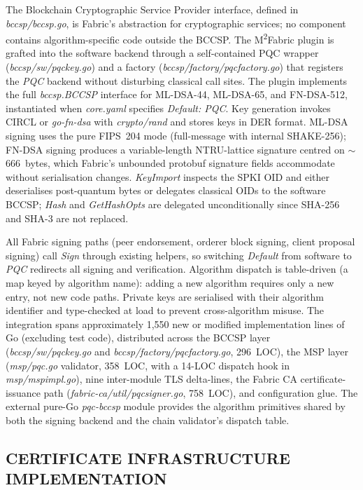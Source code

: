 \documentclass{ieeetj}
\newcommand{\mfabric}{M\textsuperscript{2}Fabric}
\begin{document}
The Blockchain Cryptographic Service Provider interface, defined in
\textit{bccsp/bccsp.go}, is Fabric's abstraction for cryptographic
services; no component contains algorithm-specific code outside the
BCCSP. The \mfabric{} plugin is grafted into the software backend
through a self-contained PQC wrapper (\textit{bccsp/sw/pqckey.go}) and a
factory (\textit{bccsp/factory/pqcfactory.go}) that registers the
\textit{PQC} backend without disturbing classical call sites. The plugin
implements the full \textit{bccsp.BCCSP} interface for ML-DSA-44,
ML-DSA-65, and FN-DSA-512, instantiated when \textit{core.yaml} specifies
\textit{Default: PQC}. Key generation invokes CIRCL or
\textit{go-fn-dsa} with \textit{crypto/rand} and stores keys in DER
format. ML-DSA signing uses the pure FIPS~204 mode (full-message with
internal SHAKE-256); FN-DSA signing produces a variable-length
NTRU-lattice signature centred on $\sim$666~bytes, which Fabric's
unbounded protobuf signature fields accommodate without serialisation
changes. \textit{KeyImport} inspects the SPKI OID and either
deserialises post-quantum bytes or delegates classical OIDs to the
software BCCSP; \textit{Hash} and \textit{GetHashOpts} are delegated
unconditionally since SHA-256 and SHA-3 are not replaced.

All Fabric signing paths (peer endorsement, orderer block signing, client
proposal signing) call \textit{Sign} through existing helpers, so
switching \textit{Default} from software to \textit{PQC} redirects all
signing and verification. Algorithm dispatch is table-driven (a map keyed
by algorithm name): adding a new algorithm requires only a new entry, not
new code paths. Private keys are serialised with their algorithm
identifier and type-checked at load to prevent cross-algorithm misuse.
The integration spans approximately 1{,}550 new or modified
implementation lines of Go (excluding test code),
distributed across the BCCSP layer (\textit{bccsp/sw/pqckey.go} and
\textit{bccsp/factory/pqcfactory.go}, 296~LOC), the MSP layer
(\textit{msp/pqc.go} validator, 358~LOC, with a 14-LOC dispatch hook
in \textit{msp/mspimpl.go}), nine inter-module TLS delta-lines, the
Fabric CA certificate-issuance path (\textit{fabric-ca/util/pqcsigner.go},
758~LOC), and configuration glue. The external pure-Go
\textit{pqc-bccsp} module provides the algorithm primitives shared by
both the signing backend and the chain validator's dispatch table.

\subsection{CERTIFICATE INFRASTRUCTURE IMPLEMENTATION}
\label{sec:method_ca}
\end{document}
